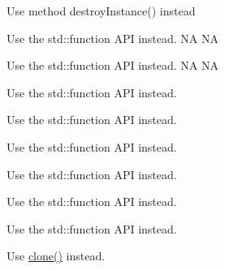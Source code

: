 \begin{DoxyRefList}
Use method destroy\+Instance() instead  
\item[\label{deprecated__deprecated000013}%
\Hypertarget{deprecated__deprecated000013}%
Member \hyperlink{classCallFunc_a4c5cbd1f08044f6e988abe5bb5c1a389}{Call\+Func\+:\+:create} (\hyperlink{classRef}{Ref} $\ast$target, S\+E\+L\+\_\+\+Call\+Func selector)]Use the std\+::function A\+PI instead.  NA  NA 

Use the std\+::function A\+PI instead.  NA  NA  
\item[\label{deprecated__deprecated000014}%
\Hypertarget{deprecated__deprecated000014}%
Member \hyperlink{classCallFunc_a68a7834d7931d5439faf49ca6e955dd7}{Call\+Func\+:\+:init\+With\+Target} (\hyperlink{classRef}{Ref} $\ast$target)]Use the std\+::function A\+PI instead. 

Use the std\+::function A\+PI instead.  
\item[\label{deprecated__deprecated000015}%
\Hypertarget{deprecated__deprecated000015}%
Member \hyperlink{classCallFuncN_a12371cadea736eca54cef676dbe9dab9}{Call\+FuncN\+:\+:create} (\hyperlink{classRef}{Ref} $\ast$target, S\+E\+L\+\_\+\+Call\+FuncN selector)]Use the std\+::function A\+PI instead. 

Use the std\+::function A\+PI instead.  
\item[\label{deprecated__deprecated000016}%
\Hypertarget{deprecated__deprecated000016}%
Member \hyperlink{classCallFuncN_a6f2f7343dc7aa74035dbf89c45a4e2f3}{Call\+FuncN\+:\+:init\+With\+Target} (\hyperlink{classRef}{Ref} $\ast$target, S\+E\+L\+\_\+\+Call\+FuncN selector)]Use the std\+::function A\+PI instead. 

Use the std\+::function A\+PI instead.  
\item[\label{deprecated__deprecated000053}%
\Hypertarget{deprecated__deprecated000053}%
Member \hyperlink{classClonable_a5fd8dad9fd4321a1372423892e16dad8}{Clonable\+:\+:copy} () const]Use \hyperlink{classClonable_a36b05a0fa605f4f269e5884bde7f9e0c}{clone()} instead. 


\end{DoxyRefList}

